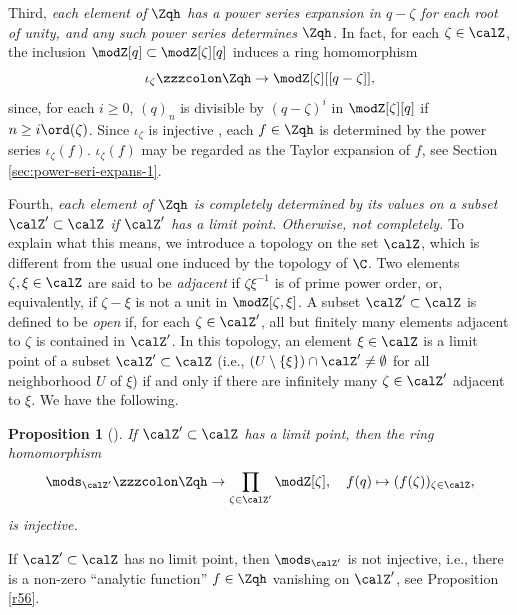 \documentclass{amsart}
\numberwithin{equation}{section}
\numberwithin{figure}{section}
\theoremstyle{plain}
\newtheorem{proposition}[theorem]{Proposition}
\theoremstyle{definition}
\theoremstyle{remark}
\begin{document}
Third, {\em each element of $\Zqh$ has a power series expansion in
  $q-\zeta $ for each root of unity, and any such power series determines
  $\Zqh$.}  In fact, for each $\zeta \in \calZ$, the inclusion
$\modZ [q]\subset \modZ [\zeta ][q]$ induces a ring homomorphism
\begin{equation}
  \label{e6}
  \iota _\zeta \zzzcolon \Zqh\rightarrow \modZ [\zeta ][[q-\zeta ]],
\end{equation}
since, for each $i\ge 0$, $(q)_n$ is divisible by $(q-\zeta )^i$ in
$\modZ [\zeta ][q]$ if $n\ge i\ord(\zeta )$.  Since $\iota _\zeta $ is injective
\cite[Theorem 5.2]{H:cyclotomic}, each $f\in \Zqh$ is determined by the
power series $\iota _\zeta (f)$.  $\iota _\zeta (f)$ may be regarded as the Taylor
expansion of $f$, see Section \ref{sec:power-seri-expans-1}.

Fourth, {\em each element of $\Zqh$ is completely determined by its
values on a subset $\calZ'\subset \calZ$ if $\calZ'$ has a limit point.
Otherwise, not completely.}  To explain what this means, we introduce
a topology on the set $\calZ$, which is different from the usual one
induced by the topology of $\C$.  Two elements $\zeta ,\xi \in \calZ$ are said
to be {\em adjacent} if $\zeta \xi ^{-1}$ is of prime power order, or,
equivalently, if $\zeta -\xi $ is not a unit in $\modZ [\zeta ,\xi ]$.  A subset
$\calZ'\subset \calZ$ is defined to be {\em open} if, for each $\zeta \in \calZ'$,
all but finitely many elements adjacent to $\zeta $ is contained in
$\calZ'$.  In this topology, an element
$\xi \in \calZ$ is a limit point of a subset $\calZ'\subset \calZ$ (i.e.,
$(U\setminus \{\xi \})\cap \calZ'\neq\emptyset$ for all neighborhood $U$ of $\xi $)
if and only if there are infinitely many $\zeta \in \calZ'$ adjacent to
$\xi $.  We have the following.

\begin{proposition}[{\cite[Theorem 6.3]{H:cyclotomic}}]
  \label{r85}
  If $\calZ'\subset \calZ$ has a limit point, then the ring homomorphism
  \begin{equation}
    \label{e61}
    \mods _{\calZ'}\zzzcolon \Zqh\rightarrow \prod_{\zeta \in \calZ'}\modZ [\zeta ],\quad
    f(q)\mapsto (f(\zeta ))_{\zeta \in \calZ},
  \end{equation}
  is injective.
\end{proposition}

If $\calZ'\subset \calZ$ has no limit point, then $\mods _{\calZ'}$ is not
injective, i.e., there is a non-zero ``analytic function'' $f\in \Zqh$
vanishing on $\calZ'$, see Proposition \ref{r56}.
\end{document}
